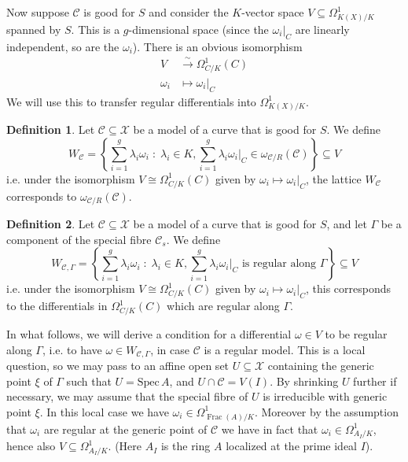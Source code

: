 \documentclass{article}
\theoremstyle{definition}
\newtheorem{defn}{Definition}[section]
\theoremstyle{plain}
\theoremstyle{remark}
\newcommand{\spec}{\mathrm{Spec}\,}
\DeclareMathOperator{\Frac}{\mathrm{Frac}}
\begin{document}
	Now suppose $\mathcal{C}$ is good for $S$ and consider the $K$-vector space $V\subseteq \Omega^1_{K(X)/K}$ spanned by $S$. This is a $g$-dimensional space (since the $\omega_i|_C$ are linearly independent, so are the $\omega_i$). There is an obvious isomorphism
	\begin{align*}
		V &\xrightarrow{\sim} \Omega^1_{C/K}(C)\\
		\omega_i &\mapsto \omega_i|_C
	\end{align*}
	We will use this to transfer regular differentials into $\Omega^1_{K(X)/K}$.
	\begin{defn}
		Let $\mathcal{C}\subseteq \mathcal{X}$ be a model of a curve that is good for $S$. We define
		\[W_\mathcal{C} = \left\{\sum_{i=1}^g \lambda_i \omega_i \;:\; \lambda_i\in K, \sum_{i=1}^g \lambda_i \omega_i|_C \in \omega_{\mathcal{C}/R}(\mathcal{C}) \right\}\subseteq V\]
		i.e. under the isomorphism $V\cong \Omega^1_{C/K}(C)$ given by $\omega_i \mapsto \omega_i|_C$, the lattice $W_\mathcal{C}$ corresponds to $\omega_{\mathcal{C}/R}(\mathcal{C})$. 
	\end{defn}
	\begin{defn}
		Let $\mathcal{C}\subseteq \mathcal{X}$ be a model of a curve that is good for $S$, and let $\Gamma$ be a component of the special fibre $\mathcal{C}_s$. We define
		\[W_{\mathcal{C}, \Gamma} = \left\{\sum_{i=1}^g \lambda_i\omega_i\;:\; \lambda_i\in K, \sum_{i=1}^g \lambda_i\omega_i|_C \text{ is regular along $\Gamma$}\right\}\subseteq V\]
		i.e. under the isomorphism $V\cong \Omega^1_{C/K}(C)$ given by $\omega_i \mapsto \omega_i|_C$, this corresponds to the differentials in $\Omega^1_{C/K}(C)$ which are regular along $\Gamma$.
	\end{defn} 
	
	In what follows, we will derive a condition for a differential $\omega\in V$ to be regular along $\Gamma$, i.e. to have $\omega\in W_{\mathcal{C}, \Gamma}$, in case $\mathcal{C}$ is a regular model. This is a local question, so we may pass to an affine open set $U\subseteq \mathcal{X}$ containing the generic point $\xi$ of $\Gamma$ such that $U = \spec A$, and $U\cap \mathcal{C} = V(I)$. By shrinking $U$ further if necessary, we may assume that the special fibre of $U$ is irreducible with generic point $\xi$. In this local case we have $\omega_i\in \Omega^1_{\Frac(A)/K}$. Moreover by the assumption that $\omega_i$ are regular at the generic point of $\mathcal{C}$ we have in fact that $\omega_i \in \Omega^1_{A_I/K}$, hence also $V\subseteq \Omega^1_{A_I/K}$. (Here $A_I$ is the ring $A$ localized at the prime ideal $I$).
	
\end{document}
